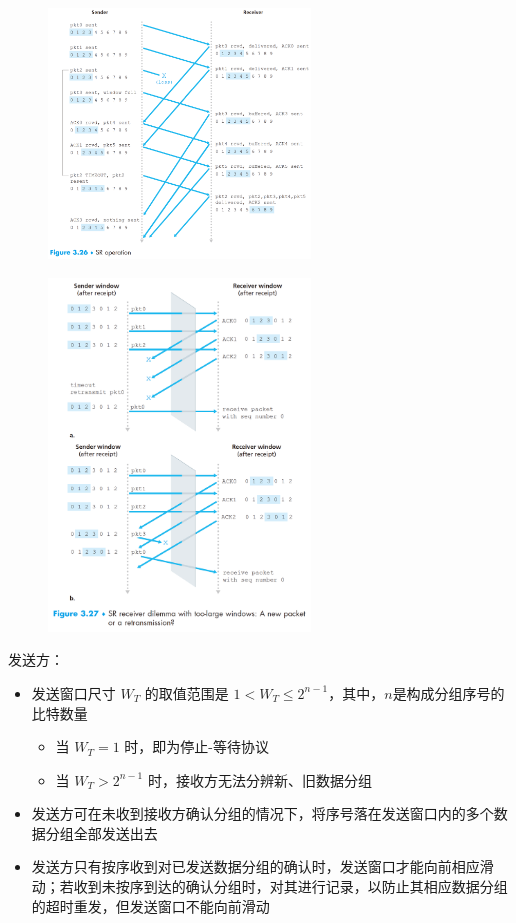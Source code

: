 \documentclass[cs4size,a4paper,10pt]{ctexart}
\begin{document}
	\begin{figure}[H]
		\centering
		\includegraphics[width=0.62\textwidth]{img/3.2.4.2}
	\end{figure}

	\begin{figure}[H]
		\centering
		\includegraphics[width=0.62\textwidth]{img/3.2.4.3}
	\end{figure}

	发送方：
	\begin{itemize}
		\item 发送窗口尺寸 $W_T$ 的取值范围是 $1<W_T \leq 2^{n-1}$，其中，$n$​ 是构成分组序号的比特数量
		\begin{itemize}
			\item 当 $W_T=1$ 时，即为停止-等待协议
			\item 当 $W_T>2^{n-1}$ 时，接收方无法分辨新、旧数据分组
		\end{itemize}
		\item 发送方可在未收到接收方确认分组的情况下，将序号落在发送窗口内的多个数据分组全部发送出去
		\item 发送方只有按序收到对已发送数据分组的确认时，发送窗口才能向前相应滑动；若收到未按序到达的确认分组时，对其进行记录，以防止其相应数据分组的超时重发，但发送窗口不能向前滑动
	\end{itemize}
\end{document}

